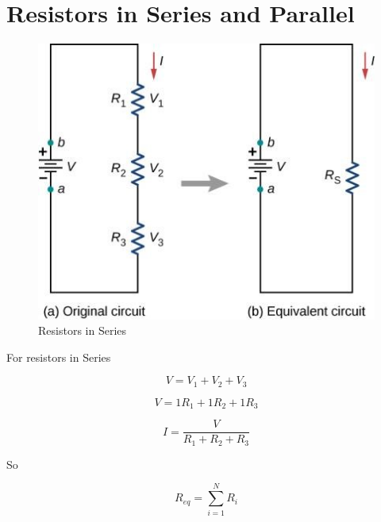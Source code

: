 \documentclass[14pt]{memoir}
\begin{document}
\section{Resistors in Series and Parallel}

\begin{figure}[H]
\begin{center}
\includegraphics[scale=0.50]{fig/fig_10_12.jpg}
\caption{Resistors in Series}
\label{fig:10_12}
\end{center}
\end{figure}

For resistors in Series

\begin{equation}
V = V_1 + V_2 + V_3
\end{equation}

\begin{equation}
V = 1R_1 + 1R_2 + 1R_3
\end{equation}

\begin{equation}
I = \frac{V}{R_1 + R_2 + R_3}
\end{equation}

So

\begin{equation}
R_{eq} = \sum_{i=1}^{N} R_i
\end{equation}
\end{document}
